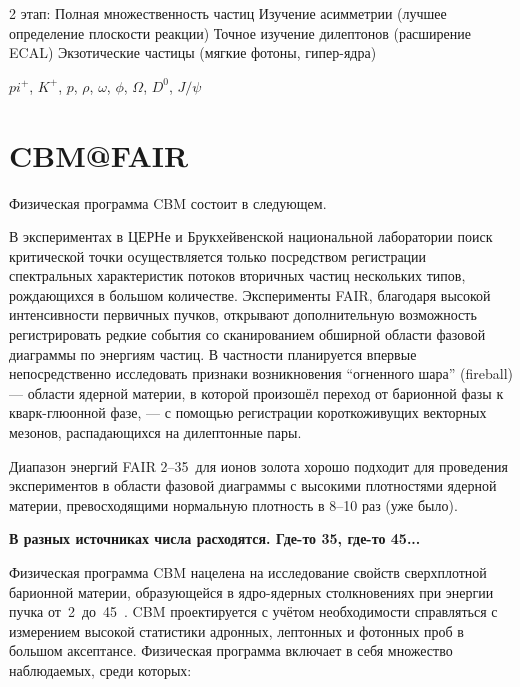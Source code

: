 2 этап:
Полная множественность частиц
Изучение асимметрии (лучшее определение плоскости реакции)
Точное изучение дилептонов (расширение ECAL)
Экзотические частицы (мягкие фотоны, гипер-ядра)


$pi^{+}$, $K^{+}$, $p$, $\rho$, $\omega$, $\phi$, $\Omega$, $D^{0}$, $J/\psi$

\section{CBM@FAIR}

Физическая программа CBM состоит в следующем.

В экспериментах в ЦЕРНе и Брукхейвенской национальной лаборатории поиск критической точки осуществляется только посредством регистрации спектральных характеристик потоков вторичных частиц нескольких типов, рождающихся в большом количестве. Эксперименты FAIR, благодаря высокой интенсивности первичных пучков, открывают дополнительную возможность регистрировать редкие события со сканированием обширной области фазовой диаграммы по энергиям частиц. В частности планируется впервые непосредственно исследовать признаки возникновения ``огненного шара'' (fireball) --- области ядерной материи, в которой произошёл переход от барионной фазы к кварк-глюонной фазе, --- с помощью регистрации короткоживущих векторных мезонов, распадающихся на дилептонные пары.

Диапазон энергий FAIR 2--35~\GeVperNucl для ионов золота хорошо подходит для проведения экспериментов в области фазовой диаграммы с высокими плотностями ядерной материи, превосходящими нормальную плотность в 8--10 раз (уже было).

\todo \textbf{В разных источниках числа расходятся. Где-то 35, где-то 45...}

Физическая программа CBM нацелена на исследование свойств сверхплотной барионной материи, образующейся в ядро-ядерных столкновениях при энергии пучка от~2~до~45~\GeVperNucl. CBM проектируется с учётом необходимости справляться с измерением высокой статистики адронных, лептонных и фотонных проб в большом аксептансе. Физическая программа включает в себя множество наблюдаемых, среди которых:

